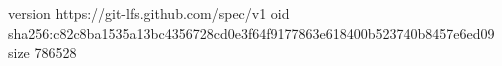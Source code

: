 version https://git-lfs.github.com/spec/v1
oid sha256:c82c8ba1535a13bc4356728cd0e3f64f9177863e618400b523740b8457e6ed09
size 786528
